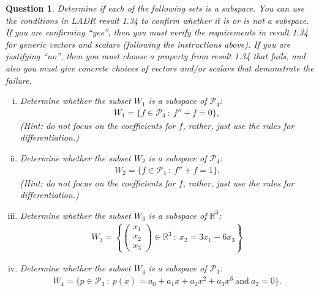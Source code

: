 \documentclass[12pt]{article}
\newtheorem{question}[thm]{Question}
\def\real{{\mathbb R}}
\def\P{\mathcal P}
\newcommand{\ColVecThree}[3]{\begin{pmatrix} #1\\ #2\\ #3\end{pmatrix}}
\begin{document}
\begin{question}
	\normalfont
	
	
	Determine if each of the following sets is a subspace.  You can use the conditions in LADR result 1.34 to confirm whether it is or is not a subspace.  If you are confirming ``yes'', then you must verify the requirements in result 1.34 for generic vectors and scalars (following the instructions above).  If you are justifying ``no'', then you must choose a property from result 1.34 that fails, and also you must give concrete choices of vectors and/or scalars that demonstrate the failure.
	
	
	\begin{enumerate}[(i)]
		\item Determine whether the subset $W_1$ is a subspace of $\P_4$:
		\begin{align*}
			W_1=\{ f\in \P_4\ : \ f''+f=0 \},
		\end{align*}
		(Hint: do not focus on the coefficients for $f$, rather, just use the rules for differentiation.)
		
		\vspace{.6cm}
		
		\item Determine whether the subset $W_2$  is a subspace of $\P_4$:
		\begin{align*}
			W_2=\{ f\in \P_4\ : \ f''+f=1 \}.
		\end{align*}
		(Hint: do not focus on the coefficients for $f$, rather, just use the rules for differentiation.)
		
		\vspace{.6cm}
		
		
		\item  Determine whether the subset $W_3$ is a subspace of $\real^3$:
		\begin{align*}
			W_3 = \left\{ \ColVecThree{x_1}{x_2}{x_3}\in \real^3 \ :\ x_2 = 3x_1 - 6x_3  \right\}
		\end{align*}
		
		\vspace{.6cm}
		
		\item Determine whether the subset $W_4$  is a subspace of $\P_3$:
		\begin{align*}
			W_4 = \{ p\in\P_3\ : \ p(x) = a_0 + a_1x + a_2 x^2 + a_3x^3\ \text{and}\ a_2=0 \}.
		\end{align*}
		
		
		\vspace{.6cm}
		

\end{enumerate}
\end{question}
\end{document}
